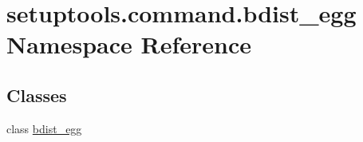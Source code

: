 \hypertarget{namespacesetuptools_1_1command_1_1bdist__egg}{}\section{setuptools.\+command.\+bdist\+\_\+egg Namespace Reference}
\label{namespacesetuptools_1_1command_1_1bdist__egg}
\subsection*{Classes}
\begin{DoxyCompactItemize}
\item 
class \hyperlink{classsetuptools_1_1command_1_1bdist__egg_1_1bdist__egg}{bdist\+\_\+egg}
\end{DoxyCompactItemize}
